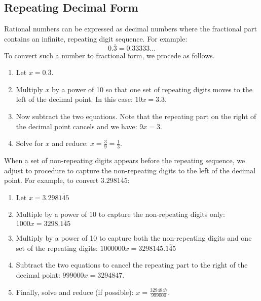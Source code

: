 \documentclass[letterpaper,12pt,fleqn]{article}
\begin{document}
\subsection*{Repeating Decimal Form}

Rational numbers can be expressed as decimal numbers where the fractional part
contains an infinite, repeating digit sequence.  For example:
\[0.\overline{3}=0.33333\ldots\]
To convert such a number to fractional form, we procede as follows.
\begin{enumerate}
\item Let $x=0.\overline{3}$.
\item Multiply $x$ by a power of 10 so that one set of repeating digits moves
to the left of the decimal point. In this case: $10x=3.\overline{3}$.
\item Now subtract the two equations. Note that the repeating part on the right
of the decimal point cancels and we have: $9x=3$.
\item Solve for $x$ and reduce: $x=\frac{3}{9}=\frac{1}{3}$.
\end{enumerate}

When a set of non-repeating digits appears before the repeating sequence, we
adjust to procedure to capture the non-repeating digits to the left of the
decimal point. For example, to convert $3.298\overline{145}$:
\begin{enumerate}
\item Let $x=3.298\overline{145}$
\item Multiple by a power of 10 to capture the non-repeating digits only:
$1000x=3298.\overline{145}$
\item Multiply by a power of 10 to capture both the non-repeating digits and
one set of the repeating digits: $1000000x=3298145.\overline{145}$
\item Subtract the two equations to cancel the repeating part to the right of
the decimal point: $999000x=3294847$.
\item Finally, solve and reduce (if possible): $x=\frac{3294847}{999000}$.
\end{enumerate}
\end{document}

